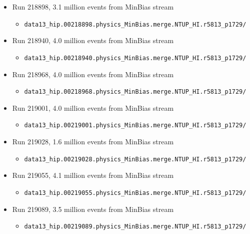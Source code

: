 \begin{itemize}
\item Run 218898, 3.1 million events from MinBias stream
\begin{itemize}[leftmargin=*]
\item[] \verb|data13_hip.00218898.physics_MinBias.merge.NTUP_HI.r5813_p1729/|
\end{itemize}

\item Run 218940, 4.0 million events from MinBias stream
\begin{itemize}[leftmargin=*]
\item[] \verb|data13_hip.00218940.physics_MinBias.merge.NTUP_HI.r5813_p1729/|
\end{itemize}

\item Run 218968, 4.0 million events from MinBias stream
\begin{itemize}[leftmargin=*]
\item[] \verb|data13_hip.00218968.physics_MinBias.merge.NTUP_HI.r5813_p1729/|
\end{itemize}

\item Run 219001, 4.0 million events from MinBias stream
\begin{itemize}[leftmargin=*]
\item[] \verb|data13_hip.00219001.physics_MinBias.merge.NTUP_HI.r5813_p1729/|
\end{itemize}

\item Run 219028, 1.6 million events from MinBias stream
\begin{itemize}[leftmargin=*]
\item[] \verb|data13_hip.00219028.physics_MinBias.merge.NTUP_HI.r5813_p1729/|
\end{itemize}

\item Run 219055, 4.1 million events from MinBias stream
\begin{itemize}[leftmargin=*]
\item[] \verb|data13_hip.00219055.physics_MinBias.merge.NTUP_HI.r5813_p1729/|
\end{itemize}

\item Run 219089, 3.5 million events from MinBias stream
\begin{itemize}[leftmargin=*]
\item[] \verb|data13_hip.00219089.physics_MinBias.merge.NTUP_HI.r5813_p1729/|
\end{itemize}


\end{itemize}
